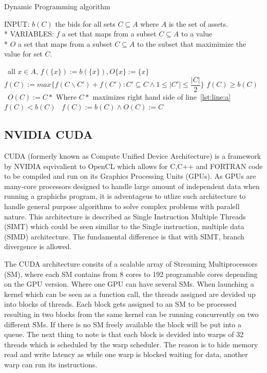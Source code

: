 \documentclass[a4paper, 12pt]{report}
\begin{document}
\begin{algorithm}
\caption{Dynamic Programming algorithm}
INPUT: $b(C)$ the bids for all sets $C \subseteq A$ where $A$ is the set of assets.\\*
VARIABLES: $f$ a set that maps from a subset $C \subseteq A$ to a value\\*
$O$ a set that maps from a subset $C \subseteq A$ to the subset that maximimize the value for set $C$.
\begin{algorithmic}[1]
\STATE\algorithmicfor\ all $x \in A$, \algorithmicdo $f(\{x\}):= b(\{x\}),O\{x\}:= \{x\}$ \algorithmicendfor
{}
\STATE $f(C) := max\{f(C\backslash C')+f(C'):C'\subseteq C \wedge 1 \leq \vert C' \vert \leq \dfrac{\vert C \vert}{2}\}$ \label{lst:line:a}
\STATE\algorithmicif $f(C) \geq b(C)$ \algorithmicthen\ $O(C) := C*$ \hfill Where $C*$ maximizes right hand side of line~\ref{lst:line:a} \algorithmicendif
\STATE\algorithmicif $f(C) < b(C)$ \algorithmicthen\ $f(C) := b(C)\wedge O(C) := C$ \algorithmicendif
\ENDFOR
\ENDFOR
\end{algorithmic}
\end{algorithm}

\subsection{NVIDIA CUDA}
CUDA (formerly known as Compute Unified Device Architecture) is a framework by NVIDIA eqvivalient to OpenCL which allows for C,C++ and FORTRAN code to be compiled and run on its Graphics Processing Units (GPUs). As GPUs are many-core processors designed to handle large amount of independent data when running a graphichs program, it is adventageus to utlize such architecture to handle general purpose algorithms to solve complex problems with paralell nature. This architecture is described as Single Instruction Multiple Threads (SIMT) which could be seen simillar to the Single instruction, multiple data (SIMD) architecture. The fundamental difference is that with SIMT, branch divergence is allowed.

The CUDA architecture consits of a scalable array of Streaming Multiprocessors (SM), where each SM contains from 8 cores to 192 programable cores depending on the GPU version. Where one GPU can have several SMs. When launching a kernel which can be seen as a function call, the threads assigned are devided up into blocks of threads. Each block gets assigned to an SM to be processed resulting in two blocks from the same kernel can be running concurrently on two different SMs. If there is no SM freely available the block will be put into a queue. The next thing to note is that each block is devided into warps of 32 threads which is scheduled by the warp scheduler. The reason is to hide memory read and write latency as while one warp is blocked waiting for data, another warp can run its instructions.
\end{document}
